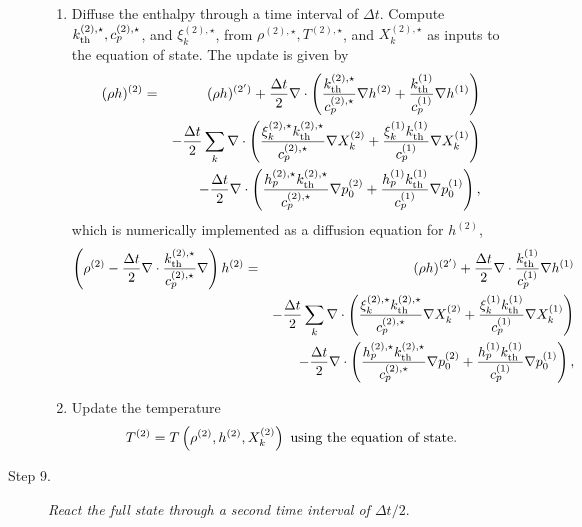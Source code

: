 \documentclass[11pt]{article}
\newcommand{\kth}{k_{\rm th}}
\newcommand{\dt}{\Delta t}
\begin{document}
\begin{description}
\begin{enumerate}
\item Diffuse the enthalpy through a time interval of $\dt$.  Compute $\kth^{(2),\star}, c_p^{(2),\star}$, and $\xi_k^{(2),\star}$, from $\rho^{(2),\star}, T^{(2),\star}$, and $X_k^{(2),\star}$ as inputs to the equation of state.  The update is given by
\begin{eqnarray}
(\rho h)^{(2)} &=& (\rho h)^{(2')} + \frac{\dt}{2}\nabla\cdot\left(\frac{\kth^{(2),\star}}{c_p^{(2),\star}}\nabla h^{(2)} + \frac{\kth^{(1)}}{c_p^{(1)}}\nabla h^{(1)}\right)\nonumber\\
&&- \frac{\dt}{2}\sum_k\nabla\cdot\left(\frac{\xi_k^{(2),\star}\kth^{(2),\star}}{c_p^{(2),\star}}\nabla X_k^{(2)} + \frac{\xi_k^{(1)}\kth^{(1)}}{c_p^{(1)}}\nabla X_k^{(1)}\right)\nonumber\\
&&- \frac{\dt}{2}\nabla\cdot\left(\frac{h_p^{(2),\star}\kth^{(2),\star}}{c_p^{(2),\star}}\nabla p_0^{(2)} + \frac{h_p^{(1)}\kth^{(1)}}{c_p^{(1)}}\nabla p_0^{(1)}\right),
\end{eqnarray}
which is numerically implemented as a diffusion equation for $h^{(2)}$,
\begin{eqnarray}
\left(\rho^{(2)} - \frac{\dt}{2}\nabla\cdot\frac{\kth^{(2),\star}}{c_p^{(2),\star}}\nabla\right)h^{(2)} &=& (\rho h)^{(2')} + \frac{\dt}{2}\nabla\cdot\frac{\kth^{(1)}}{c_p^{(1)}}\nabla h^{(1)}\nonumber\\
&&- \frac{\dt}{2}\sum_k\nabla\cdot\left(\frac{\xi_k^{(2),\star}\kth^{(2),\star}}{c_p^{(2),\star}}\nabla X_k^{(2)} + \frac{\xi_k^{(1)}\kth^{(1)}}{c_p^{(1)}}\nabla X_k^{(1)}\right)\nonumber\\
&&- \frac{\dt}{2}\nabla\cdot\left(\frac{h_p^{(2),\star}\kth^{(2),\star}}{c_p^{(2),\star}}\nabla p_0^{(2)} + \frac{h_p^{(1)}\kth^{(1)}}{c_p^{(1)}}\nabla p_0^{(1)}\right),
\end{eqnarray}
\item Update the temperature
\begin{equation}
T^{(2)} = T\left(\rho^{(2)}, h^{(2)}, X_k^{(2)}\right) {\hbox{ \rm using the equation of state.}}
\end{equation}

\end{enumerate}

\item[Step 9.] {\em React the full state through a second time interval of $\dt / 2.$}


\end{description}
\end{document}
